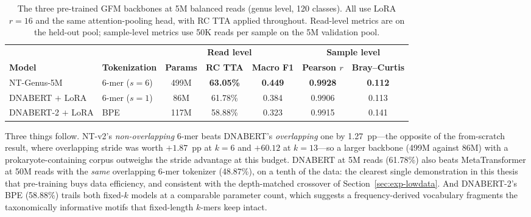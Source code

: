 \begin{table}[htbp]
    \centering
    \caption{The three pre-trained GFM backbones at 5M balanced reads (genus level, 120 classes). All use LoRA $r=16$ and the same attention-pooling head, with RC TTA applied throughout. Read-level metrics are on the held-out pool; sample-level metrics use 50K reads per sample on the 5M validation pool.}
    \label{tab:backbone-tokenization-5M}
    \small
    \setlength{\tabcolsep}{4pt}
    \begin{tabular}{llccccc}
        \toprule
        & & \multicolumn{3}{c}{\textbf{Read level}} & \multicolumn{2}{c}{\textbf{Sample level}} \\
        \cmidrule(lr){3-5}\cmidrule(lr){6-7}
        \textbf{Model} & \textbf{Tokenization} & \textbf{Params} & \textbf{RC TTA} & \textbf{Macro F1} & \textbf{Pearson $r$} & \textbf{Bray--Curtis} \\
        \midrule
        NT-Genus-5M      & 6-mer ($s{=}6$)  & 499M & \textbf{63.05\%} & \textbf{0.449} & \textbf{0.9928} & \textbf{0.112} \\
        DNABERT $+$ LoRA   & 6-mer ($s{=}1$)  & 86M  & 61.78\%          & 0.384          & 0.9906 & 0.113 \\
        DNABERT-2 $+$ LoRA & BPE              & 117M & 58.88\%          & 0.323          & 0.9915 & 0.141 \\
        \bottomrule
    \end{tabular}
\end{table}

Three things follow. NT-v2's \emph{non-overlapping} 6-mer beats DNABERT's
\emph{overlapping} one by 1.27~pp---the opposite of the from-scratch result, where
overlapping stride was worth $+1.87$~pp at $k=6$ and $+60.12$ at $k=13$---so a larger
backbone (499M against 86M) with a prokaryote-containing corpus outweighs the stride
advantage at this budget. DNABERT at 5M reads (61.78\%) also beats MetaTransformer at
50M reads with the \emph{same} overlapping 6-mer tokenizer (48.87\%), on a tenth of the
data: the clearest single demonstration in this thesis that pre-training buys data
efficiency, and consistent with the depth-matched crossover of
Section~\ref{sec:exp-lowdata}. And DNABERT-2's BPE (58.88\%) trails both fixed-$k$
models at a comparable parameter count, which suggests a frequency-derived vocabulary
fragments the taxonomically informative motifs that fixed-length $k$-mers keep intact.

